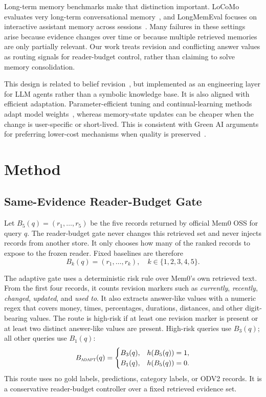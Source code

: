 \documentclass{article}
\begin{document}
Long-term memory benchmarks make that distinction important. LoCoMo evaluates very long-term conversational memory~\cite{maharana2024locomo}, and LongMemEval focuses on interactive assistant memory across sessions~\cite{wu2025longmemeval}. Many failures in these settings arise because evidence changes over time or because multiple retrieved memories are only partially relevant. Our work treats revision and conflicting answer values as routing signals for reader-budget control, rather than claiming to solve memory consolidation.

This design is related to belief revision~\cite{alchourron1985logic}, but implemented as an engineering layer for LLM agents rather than a symbolic knowledge base. It is also aligned with efficient adaptation. Parameter-efficient tuning and continual-learning methods adapt model weights~\cite{hu2022lora,wang2024comprehensive}, whereas memory-state updates can be cheaper when the change is user-specific or short-lived. This is consistent with Green AI arguments for preferring lower-cost mechanisms when quality is preserved~\cite{strubell2019energy,schwartz2020green}.

\section{Method}

\subsection{Same-Evidence Reader-Budget Gate}

Let $B_5(q)=(r_1,\ldots,r_5)$ be the five records returned by official Mem0 OSS for query $q$. The reader-budget gate never changes this retrieved set and never injects records from another store. It only chooses how many of the ranked records to expose to the frozen reader. Fixed baselines are therefore
\begin{equation}
B_k(q)=(r_1,\ldots,r_k),\quad k\in\{1,2,3,4,5\}.
\end{equation}

The adaptive gate uses a deterministic risk rule over Mem0's own retrieved text. From the first four records, it counts revision markers such as \emph{currently}, \emph{recently}, \emph{changed}, \emph{updated}, and \emph{used to}. It also extracts answer-like values with a numeric regex that covers money, times, percentages, durations, distances, and other digit-bearing values. The route is high-risk if at least one revision marker is present or at least two distinct answer-like values are present. High-risk queries use $B_3(q)$; all other queries use $B_1(q)$:
\begin{equation}
B_{\textsc{adapt}}(q)=
\begin{cases}
B_3(q), & h(B_5(q))=1,\\
B_1(q), & h(B_5(q))=0.
\end{cases}
\end{equation}
This route uses no gold labels, predictions, category labels, or ODV2 records. It is a conservative reader-budget controller over a fixed retrieved evidence set.
\end{document}
